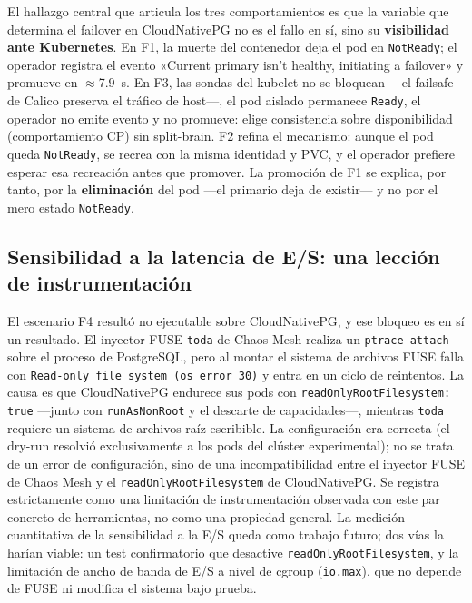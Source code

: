 \documentclass[a4paper]{llncs}
\begin{document}
El hallazgo central que articula los tres comportamientos es que la variable que
determina el failover en CloudNativePG no es el fallo en sí, sino su
\textbf{visibilidad ante Kubernetes}. En F1, la muerte del contenedor deja el pod
en \texttt{NotReady}; el operador registra el evento «Current primary isn't
healthy, initiating a failover» y promueve en $\approx$7.9~s. En F3, las sondas
del kubelet no se bloquean ---el failsafe de Calico preserva el tráfico de
host---, el pod aislado permanece \texttt{Ready}, el operador no emite evento y no
promueve: elige consistencia sobre disponibilidad (comportamiento CP) sin
split-brain. F2 refina el mecanismo: aunque el pod queda \texttt{NotReady}, se
recrea con la misma identidad y PVC, y el operador prefiere esperar esa
recreación antes que promover. La promoción de F1 se explica, por tanto, por la
\textbf{eliminación} del pod ---el primario deja de existir--- y no por el mero
estado \texttt{NotReady}.

\subsection{Sensibilidad a la latencia de E/S: una lección de instrumentación}

El escenario F4 resultó no ejecutable sobre CloudNativePG, y ese bloqueo es en sí
un resultado. El inyector FUSE \texttt{toda} de Chaos Mesh realiza un
\texttt{ptrace attach} sobre el proceso de PostgreSQL, pero al montar el sistema
de archivos FUSE falla con \texttt{Read-only file system (os error 30)} y entra
en un ciclo de reintentos. La causa es que CloudNativePG endurece sus pods con
\texttt{readOnly\-Root\-Filesystem: true} ---junto con \texttt{runAsNonRoot} y el
descarte de capacidades---, mientras \texttt{toda} requiere un sistema de
archivos raíz escribible. La configuración era correcta (el dry-run resolvió
exclusivamente a los pods del clúster experimental); no se trata de un error de
configuración, sino de una incompatibilidad entre el inyector FUSE de Chaos Mesh
y el \texttt{readOnly\-Root\-Filesystem} de CloudNativePG. Se registra estrictamente
como una limitación de instrumentación observada con este par concreto de
herramientas, no como una propiedad general. La medición cuantitativa de la
sensibilidad a la E/S queda como trabajo futuro; dos vías la harían viable: un
test confirmatorio que desactive \texttt{readOnly\-Root\-Filesystem}, y la limitación
de ancho de banda de E/S a nivel de cgroup (\texttt{io.max}), que no depende de
FUSE ni modifica el sistema bajo prueba.
\end{document}
